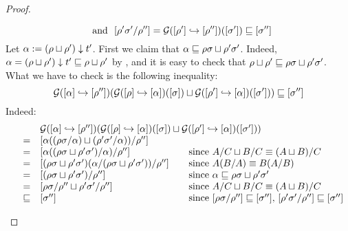 \begin{proof}
\begin{enumerate}
\begin{enumerate}
\begin{enumerate}
\[        \ \text{ and }\ %
        \cls{\redseq'\redseqtwo'/\redseq''} = \ulbG(\pt{\cls{\redseq''}}{\cls{\redseq'}})(\cls{\redseqtwo'}) \permle \cls{\redseqtwo''}
      \]
      Let $\alpha := (\rho \sqcup \rho') \downarrow t'$.
      First we claim that $\alpha \sqsubseteq \rho\sigma \sqcup \rho'\sigma'$.
      Indeed, $\alpha = (\rho \sqcup \rho') \downarrow t' \sqsubseteq \rho \sqcup \rho'$
      by , and it is easy to check that
      $\rho \sqcup \rho' \sqsubseteq \rho\sigma \sqcup \rho'\sigma'$.
      What we have to check is the following inequality:
      \[
        \mathcal{G}({[\alpha]} \hookrightarrow {[\rho'']})(
          \mathcal{G}({[\rho]} \hookrightarrow {[\alpha]})({[\sigma]})
          \sqcup
          \mathcal{G}({[\rho']} \hookrightarrow {[\alpha]})({[\sigma']})
        )
        \sqsubseteq
        {[\sigma'']}
      \]
      Indeed:
      \[
        \begin{array}{rcll}
        &&
        \ulbG(\pt{\cls{\redseq''}}{\cls{\alpha}})(
          \ulbG(\pt{\cls{\alpha}}{\cls{\redseq}})(\cls{\redseqtwo})
          \sqcup
          \ulbG(\pt{\cls{\alpha}}{\cls{\redseq'}})(\cls{\redseqtwo'})
        ) \\
        & = &
        \cls{\alpha((\redseq\redseqtwo/\alpha) \sqcup (\redseq'\redseqtwo'/\alpha))/\redseq''}
        \\
        & = &
        \cls{\alpha((\redseq\redseqtwo \sqcup \redseq'\redseqtwo')/\alpha)/\redseq''}
        &\hspace{-3cm} \text{since $A/C \sqcup B/C \permeq (A \sqcup B)/C$}
        \\
        & = &
        \cls{(\redseq\redseqtwo \sqcup \redseq'\redseqtwo')(\alpha/(\redseq\redseqtwo \sqcup \redseq'\redseqtwo'))/\redseq''}
        &\hspace{-3cm} \text{since $A(B/A) \permeq B(A/B)$}
        \\
        & = &
        \cls{(\redseq\redseqtwo \sqcup \redseq'\redseqtwo')/\redseq''}
        &\hspace{-3cm} \text{since $\alpha \permle \redseq\redseqtwo \sqcup \redseq'\redseqtwo'$}
        \\
        & = &
        \cls{\redseq\redseqtwo/\redseq'' \sqcup \redseq'\redseqtwo'/\redseq''}
        &\hspace{-3cm} \text{since $A/C \sqcup B/C \permeq (A \sqcup B)/C$}
        \\
        & \permle &
        \cls{\redseqtwo''}
        &\hspace{-3cm} \text{since $\cls{\redseq\redseqtwo/\redseq''} \permle \cls{\redseqtwo''}$, $\cls{\redseq'\redseqtwo'/\redseq''} \permle \cls{\redseqtwo''}$}
        \end{array}
      \]
    \end{enumerate}
  \end{enumerate}


\end{enumerate}
\end{proof}
